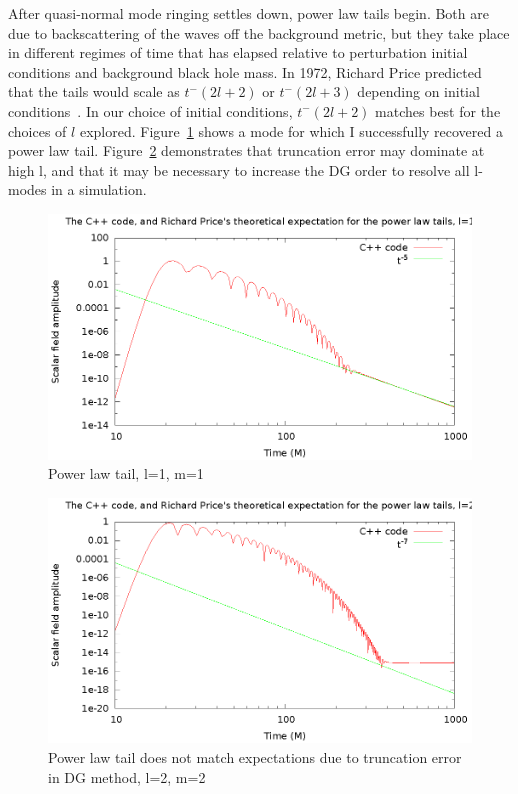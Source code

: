 After quasi-normal mode ringing settles down, power law tails begin. Both are due to backscattering of the waves off the background metric, but they take place in different regimes of time that has elapsed relative to perturbation initial conditions and background black hole mass. In 1972, Richard Price predicted that the tails would scale as $t^-(2l+2)$ or $t^-(2l+3)$ depending on initial conditions~\cite{PriceTails}. In our choice of initial conditions, $t^-(2l+2)$ matches best for the choices of $l$ explored. Figure~\ref{taill1m1} shows a mode for which I successfully recovered a power law tail. Figure~\ref{notaill2m2} demonstrates that truncation error may dominate at high l, and that it may be necessary to increase the DG order to resolve all l-modes in a simulation.

\begin{figure}
  \includegraphics{l1m1tail2}
  \caption{Power law tail, l=1, m=1}
  \label{taill1m1}
\end{figure}

\begin{figure}
  \includegraphics{l2m2tailfail2}
  \caption{Power law tail does not match expectations due to truncation error in DG method, l=2, m=2}
  \label{notaill2m2}
\end{figure}

